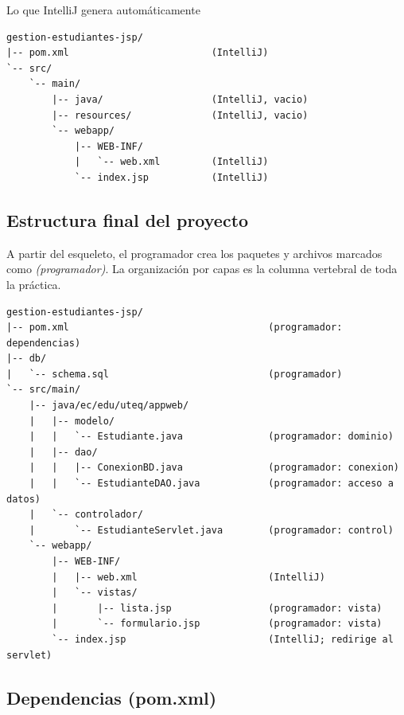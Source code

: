 \begin{cajaejemplo}{Lo que IntelliJ genera automáticamente}
\begin{lstlisting}[style=shell,caption={Esqueleto inicial creado por IntelliJ IDEA},label={lst:jsp-skel}]
gestion-estudiantes-jsp/
|-- pom.xml                         (IntelliJ)
`-- src/
    `-- main/
        |-- java/                   (IntelliJ, vacio)
        |-- resources/              (IntelliJ, vacio)
        `-- webapp/
            |-- WEB-INF/
            |   `-- web.xml         (IntelliJ)
            `-- index.jsp           (IntelliJ)
\end{lstlisting}
\end{cajaejemplo}

\subsection{Estructura final del proyecto}
\label{ap:crud:jsp:estructura}

A partir del esqueleto, el programador crea los paquetes y archivos
marcados como \emph{(programador)}. La organización por capas es la
columna vertebral de toda la práctica.

\begin{lstlisting}[style=shell,caption={Estructura completa de la pista JSP/JSTL/EL},label={lst:jsp-tree}]
gestion-estudiantes-jsp/
|-- pom.xml                                   (programador: dependencias)
|-- db/
|   `-- schema.sql                            (programador)
`-- src/main/
    |-- java/ec/edu/uteq/appweb/
    |   |-- modelo/
    |   |   `-- Estudiante.java               (programador: dominio)
    |   |-- dao/
    |   |   |-- ConexionBD.java               (programador: conexion)
    |   |   `-- EstudianteDAO.java            (programador: acceso a datos)
    |   `-- controlador/
    |       `-- EstudianteServlet.java        (programador: control)
    `-- webapp/
        |-- WEB-INF/
        |   |-- web.xml                       (IntelliJ)
        |   `-- vistas/
        |       |-- lista.jsp                 (programador: vista)
        |       `-- formulario.jsp            (programador: vista)
        `-- index.jsp                         (IntelliJ; redirige al servlet)
\end{lstlisting}

\subsection{Dependencias (pom.xml)}
\label{ap:crud:jsp:pom}

